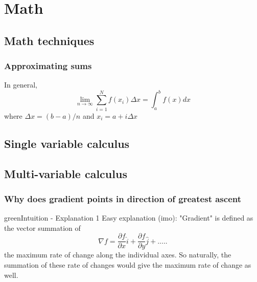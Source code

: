 \chapter{Math}
\section{Math techniques}
\subsection{Approximating sums}
In general, 
\begin{equation}
    \lim_{n\to \infty} \sum_{i=1}^N f(x_i) \Delta x= \int_a^b f(x) dx
\end{equation}
where $\Delta x=(b-a)/n$ and $x_i=a+i\Delta x$

\section{Single variable calculus}
\section{Multi-variable calculus}
\subsection{Why does gradient points in direction of greatest ascent}
\begin{mybox}{green}{Intuition - Explanation 1}
    Easy explanation (imo): "Gradient" is defined as the vector summation of
    \begin{equation}
        \nabla{f}=\frac{\partial f}{\partial x} \hat{i}+\frac{\partial f}{\partial y}\hat{j}+ .....
    \end{equation}
    the maximum rate of change along the individual axes. So naturally, the summation of these rate of changes would give the maximum rate of change as well.
\end{mybox}

